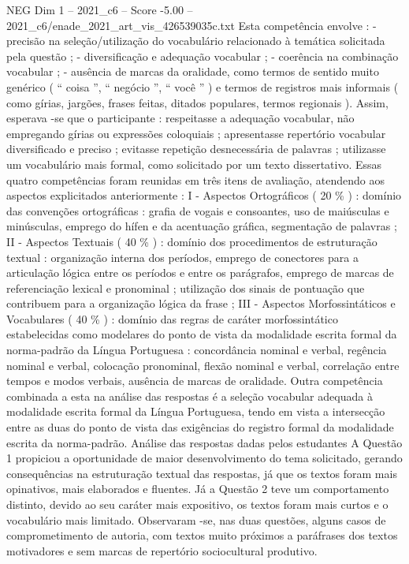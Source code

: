 \begin{textsample}{NEG Dim 1 – 2021\_c6 – Score -5.00 – 2021\_c6/enade\_2021\_art\_vis\_426539035c.txt}
Esta competência envolve : - precisão na seleção/utilização do vocabulário relacionado à temática solicitada pela questão ; - diversificação e adequação vocabular ; - coerência na combinação vocabular ; - ausência de marcas da oralidade, como termos de sentido muito genérico ( “ coisa ”, “ negócio ”, “ você ” ) e termos de registros mais informais ( como gírias, jargões, frases feitas, ditados populares, termos regionais ).
Assim, esperava -se que o participante : respeitasse a adequação vocabular, não empregando gírias ou expressões coloquiais ; apresentasse repertório vocabular diversificado e preciso ; evitasse repetição desnecessária de palavras ; utilizasse um vocabulário mais formal, como solicitado por um texto dissertativo.
Essas quatro competências foram reunidas em três itens de avaliação, atendendo aos aspectos explicitados anteriormente : I - Aspectos Ortográficos ( 20 \% ) : domínio das convenções ortográficas : grafia de vogais e consoantes, uso de maiúsculas e minúsculas, emprego do hífen e da acentuação gráfica, segmentação de palavras ; II - Aspectos Textuais ( 40 \% ) : domínio dos procedimentos de estruturação textual : organização interna dos períodos, emprego de conectores para a articulação lógica entre os períodos e entre os parágrafos, emprego de marcas de referenciação lexical e pronominal ; utilização dos sinais de pontuação que contribuem para a organização lógica da frase ; III - Aspectos Morfossintáticos e Vocabulares ( 40 \% ) : domínio das regras de caráter morfossintático estabelecidas como modelares do ponto de vista da modalidade escrita formal da norma-padrão da Língua Portuguesa : concordância nominal e verbal, regência nominal e verbal, colocação pronominal, flexão nominal e verbal, correlação entre tempos e modos verbais, ausência de marcas de oralidade.
Outra competência combinada a esta na análise das respostas é a seleção vocabular adequada à modalidade escrita formal da Língua Portuguesa, tendo em vista a intersecção entre as duas do ponto de vista das exigências do registro formal da modalidade escrita da norma-padrão.
Análise das respostas dadas pelos estudantes A Questão 1 propiciou a oportunidade de maior desenvolvimento do tema solicitado, gerando consequências na estruturação textual das respostas, já que os textos foram mais opinativos, mais elaborados e fluentes.
Já a Questão 2 teve um comportamento distinto, devido ao seu caráter mais expositivo, os textos foram mais curtos e o vocabulário mais limitado.
Observaram -se, nas duas questões, alguns casos de comprometimento de autoria, com textos muito próximos a paráfrases dos textos motivadores e sem marcas de repertório sociocultural produtivo.

\end{textsample}
